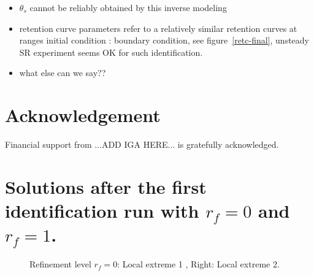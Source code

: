 \documentclass[review]{elsarticle}
\begin{document}
\begin{itemize}
\item $\theta_s$ cannot be reliably obtained by this inverse modeling 
\item retention curve parameters refer to a relatively similar retention curves at ranges initial condition : boundary condition, see figure~\ref{retc-final}, unsteady SR experiment seems OK for such identification.
\item  what else can we say??
\end{itemize}



\section{Acknowledgement}

Financial support from ...ADD IGA HERE... is gratefully acknowledged.




 


\appendix

\section{Solutions after the first identification run with $r_f=0$ and $r_f=1$.}

\begin{figure}[htb!]
\label{rf0ex1}
\caption{Refinement level $r_f=0$: Local extreme 1 , Right: Local extreme 2.}
\end{figure}
\end{document}
